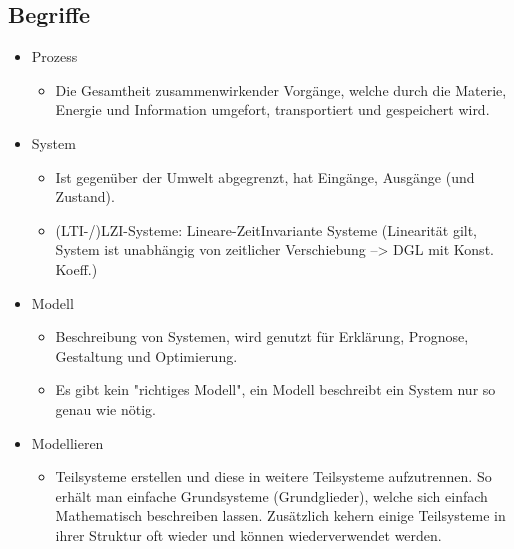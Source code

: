\documentclass[margin=normal]{tex/hsrzf}
\begin{document}
\subsection{Begriffe}
\small
\begin{itemize}
      \item Prozess
            \begin{itemize}
                  \item Die Gesamtheit zusammenwirkender Vorgänge, welche durch
                        die Materie, Energie und Information
                        umgefort, transportiert und gespeichert wird.
            \end{itemize}

      \item System
            \begin{itemize}
                  \item Ist gegenüber der Umwelt abgegrenzt, hat Eingänge,
                        Ausgänge (und Zustand).
                  \item (LTI-/)LZI-Systeme: Lineare-ZeitInvariante Systeme
                        (Linearität gilt, System ist unabhängig von zeitlicher Verschiebung
                        --> DGL mit Konst. Koeff.)
            \end{itemize}

      \item Modell
            \begin{itemize}
                  \item Beschreibung von Systemen, wird genutzt für
                        Erklärung, Prognose, Gestaltung und Optimierung.
                  \item Es gibt kein "richtiges Modell",
                        ein Modell beschreibt ein System nur so genau wie nötig.
            \end{itemize}
      \item Modellieren
            \begin{itemize}
                  \item Teilsysteme erstellen und diese
                        in weitere Teilsysteme aufzutrennen.
                        So erhält man einfache Grundsysteme (Grundglieder),
                        welche sich einfach Mathematisch beschreiben lassen.
                        Zusätzlich kehern einige Teilsysteme in ihrer
                        Struktur oft wieder und können wiederverwendet werden.


\end{itemize}
\end{itemize}
\end{document}
